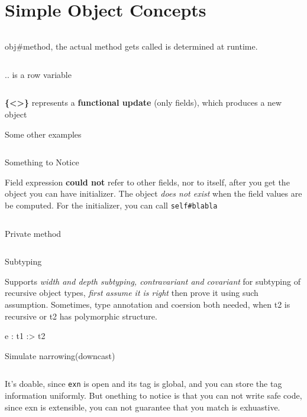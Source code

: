 

\section{Simple Object Concepts}

\inputminted[fontsize=\scriptsize, fontsize=\scriptsize, lastline=8]{ocaml}{oo/code/simple.ml}


obj\#method, the actual method gets called is determined at runtime.


\inputminted[fontsize=\scriptsize, fontsize=\scriptsize, firstline=8,lastline=15]{ocaml}{oo/code/simple.ml}


.. is a row variable 
\inputminted[fontsize=\scriptsize, fontsize=\scriptsize, firstline=15,lastline=18]{ocaml}{oo/code/simple.ml}


\textbf{ \{<>\} }represents a \textbf{functional update} (only
fields), which produces a new object


Some other examples
\inputminted[fontsize=\scriptsize, fontsize=\scriptsize, firstline=18,lastline=67]{ocaml}{oo/code/simple.ml}


Something to Notice

Field expression \textbf{could not} refer to other fields, nor to
itself, after you get the object you can have initializer. The object
\textit{does not exist} when the field values are be computed. For the
initializer, you can call \verb|self#blabla|
\inputminted[fontsize=\scriptsize, fontsize=\scriptsize, firstline=66,lastline=80]{ocaml}{oo/code/simple.ml}


Private method
\inputminted[fontsize=\scriptsize, fontsize=\scriptsize, firstline=81,lastline=88]{ocaml}{oo/code/simple.ml}


Subtyping


Supports \textit{width and depth subtyping, contravariant and
  covariant} for subtyping of recursive object types, \textit{first
  assume it is right} then prove it using such assumption. Sometimes,
type annotation and coersion both needed, when t2 is recursive or t2
has polymorphic structure.

\begin{ocamlcode}
  e : t1 :> t2
\end{ocamlcode}


Simulate narrowing(downcast)

\inputminted[fontsize=\scriptsize, fontsize=\scriptsize, ]{ocaml}{oo/code/downcast.ml}

It's doable, since \verb|exn| is open and its tag is global, and you
can store the tag information uniformly. But onething to notice is
that you can not write safe code, since exn is extensible, you can not
guarantee that you match is exhuastive.

